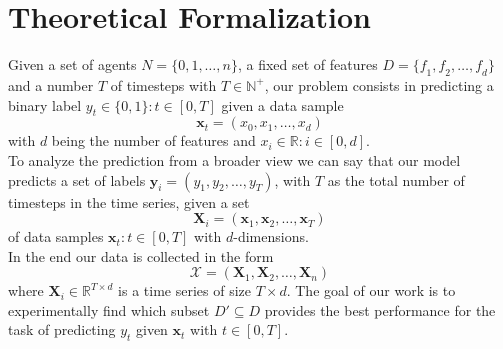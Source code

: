 \documentclass[../../Thesis.tex]{subfiles}
\begin{document}
	\section{Theoretical Formalization}
		Given a set of agents $N = \lbrace 0, 1, \dots, n \rbrace$, a fixed set of features $D = \lbrace \mathit{f}_1,  \mathit{f}_2, \dots, \mathit{f}_d \rbrace$ and a number $T$ of timesteps with $T \in \mathbb{N}^+$, our problem consists in predicting a binary label $y_t \in \lbrace 0,1 \rbrace : t \in \left[ 0, T \right]$ given a data sample 
		\[\mathbf{x}_t = (x_{0}, x_{1}, \dots, x_{d})\]
		with $d$ being the number of features and $x_{i} \in \mathbb{R}: i \in \left[ 0, d \right]$. \\
		To analyze the prediction from a broader view we can say that our model predicts a set of labels $\mathbf{y}_i = (y_{1}, y_{2}, \dots, y_{T})$, with $T$ as the total number of timesteps in the time series, given a set
		\[\mathbf{X}_i = (\mathbf{x}_1, \mathbf{x}_2, \dots, \mathbf{x}_T)\] 
		of data samples $\mathbf{x}_t : t \in \left[ 0, T \right]$ with $d$-dimensions. \\
		In the end our data is collected in the form 
		\[\mathcal{X} = (\mathbf{X}_1, \mathbf{X}_2, \dots, \mathbf{X}_n)\] 
		where $\mathbf{X}_i \in \mathbb{R}^{T \times d}$ is a time series of size $T \times d$.
		The goal of our work is to experimentally find which subset $D' \subseteq D$ provides the best performance for the task of predicting $y_t$ given $\mathbf{x}_t$ with $t \in \left[ 0, T \right]$. 
	
\end{document}
